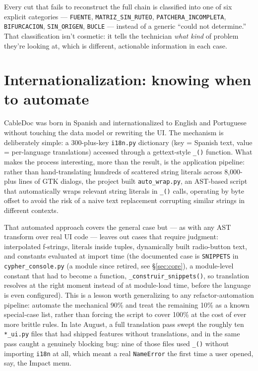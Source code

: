 \documentclass[10.4pt,twocolumn]{article}
\begin{document}
Every cut that fails to reconstruct the full chain is classified into one of six explicit categories --- \texttt{FUENTE}, \texttt{MATRIZ\_SIN\_RUTEO}, \texttt{PATCHERA\_INCOMPLETA}, \texttt{BIFURCACION}, \texttt{SIN\_ORIGEN}, \texttt{BUCLE} --- instead of a generic ``could not determine.'' That classification isn't cosmetic: it tells the technician \emph{what kind} of problem they're looking at, which is different, actionable information in each case.

\section{Internationalization: knowing when to automate}

CableDoc was born in Spanish and internationalized to English and Portuguese without touching the data model or rewriting the UI. The mechanism is deliberately simple: a 300-plus-key \texttt{i18n.py} dictionary (key = Spanish text, value = per-language translations) accessed through a gettext-style \texttt{\_()} function. What makes the process interesting, more than the result, is the application pipeline: rather than hand-translating hundreds of scattered string literals across 8{,}000-plus lines of GTK dialogs, the project built \texttt{auto\_wrap.py}, an AST-based script that automatically wraps relevant string literals in \texttt{\_()} calls, operating by byte offset to avoid the risk of a naive text replacement corrupting similar strings in different contexts.

That automated approach covers the general case but --- as with any AST transform over real UI code --- leaves out cases that require judgment: interpolated f-strings, literals inside tuples, dynamically built radio-button text, and constants evaluated at import time (the documented case is \texttt{SNIPPETS} in \texttt{cypher\_console.py} (a module since retired, see \S\ref{sec:core}), a module-level constant that had to become a function, \texttt{\_construir\_snippets()}, so translation resolves at the right moment instead of at module-load time, before the language is even configured). This is a lesson worth generalizing to any refactor-automation pipeline: automate the mechanical 90\% and treat the remaining 10\% as a known special-case list, rather than forcing the script to cover 100\% at the cost of ever more brittle rules. In late August, a full translation pass swept the roughly ten \texttt{*\_ui.py} files that had shipped features without translations, and in the same pass caught a genuinely blocking bug: nine of those files used \texttt{\_()} without importing \texttt{i18n} at all, which meant a real \texttt{NameError} the first time a user opened, say, the Impact menu.
\end{document}
